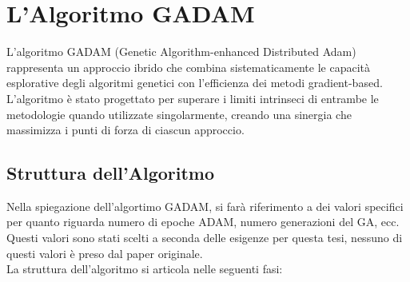 \section{L'Algoritmo GADAM}
L'algoritmo GADAM (Genetic Algorithm-enhanced Distributed Adam) rappresenta un approccio ibrido che combina sistematicamente le capacità esplorative degli algoritmi genetici con l'efficienza dei metodi gradient-based. L'algoritmo è stato progettato per superare i limiti intrinseci di entrambe le metodologie quando utilizzate singolarmente, creando una sinergia che massimizza i punti di forza di ciascun approccio.

\subsection{Struttura dell'Algoritmo}
Nella spiegazione dell'algortimo GADAM, si farà riferimento a dei valori specifici per quanto riguarda numero di epoche ADAM, numero generazioni del GA, ecc. Questi valori sono stati scelti a seconda delle esigenze per questa tesi, nessuno di questi valori è preso dal paper originale.\\
La struttura dell'algoritmo si articola nelle seguenti fasi:

